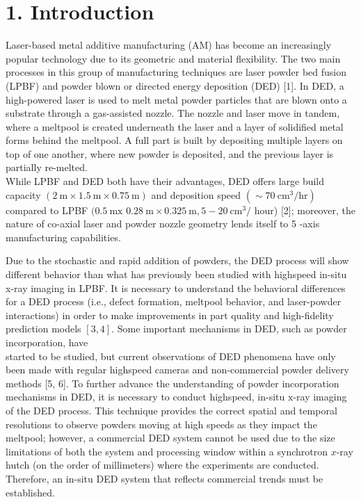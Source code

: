 \documentclass[10pt]{article}
\begin{document}
\section*{1. Introduction}
Laser-based metal additive manufacturing (AM) has become an increasingly popular technology due to its geometric and material flexibility. The two main processes in this group of manufacturing techniques are laser powder bed fusion (LPBF) and powder blown or directed energy deposition (DED) [1]. In DED, a high-powered laser is used to melt metal powder particles that are blown onto a substrate through a gas-assisted nozzle. The nozzle and laser move in tandem, where a meltpool is created underneath the laser and a layer of solidified metal forms behind the meltpool. A full part is built by depositing multiple layers on top of one another, where new powder is deposited, and the previous layer is partially re-melted.\\
While LPBF and DED both have their advantages, DED offers large build capacity $(2 \mathrm{~m} \times 1.5 \mathrm{~m} \times 0.75 \mathrm{~m})$ and deposition speed $\left(\sim 70 \mathrm{~cm}^{3} / \mathrm{hr}\right)$ compared to LPBF $(0.5 \mathrm{~m} \mathrm{x}$ $0.28 \mathrm{~m} \times 0.325 \mathrm{~m}, 5-20 \mathrm{~cm}^{3} /$ hour) [2]; moreover, the nature of co-axial laser and powder nozzle geometry lends itself to 5 -axis manufacturing capabilities.

Due to the stochastic and rapid addition of powders, the DED process will show different behavior than what has previously been studied with highspeed in-situ x-ray imaging in LPBF. It is necessary to understand the behavioral differences for a DED process (i.e., defect formation, meltpool behavior, and laser-powder interactions) in order to make improvements in part quality and high-fidelity prediction models $[3,4]$. Some important mechanisms in DED, such as powder incorporation, have\\
started to be studied, but current observations of DED phenomena have only been made with regular highspeed cameras and non-commercial powder delivery methods [5, 6]. To further advance the understanding of powder incorporation mechanisms in DED, it is necessary to conduct highspeed, in-situ $\mathrm{x}$-ray imaging of the DED process. This technique provides the correct spatial and temporal resolutions to observe powders moving at high speeds as they impact the meltpool; however, a commercial DED system cannot be used due to the size limitations of both the system and processing window within a synchrotron $x$-ray hutch (on the order of millimeters) where the experiments are conducted. Therefore, an in-situ DED system that reflects commercial trends must be established.
\end{document}
